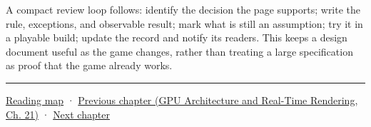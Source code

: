 A compact review loop follows: identify the decision the page supports; write the rule, exceptions, and observable result; mark what is still an assumption; try it in a playable build; update the record and notify its readers. This keeps a design document useful as the game changes, rather than treating a large specification as proof that the game already works.

\begin{center}\rule{0.5\linewidth}{0.5pt}\end{center}

\hyperref[volume-reading-map]{Reading map} · \href{../06-GPU-Architecture-and-Real-Time-Rendering/main.pdf\#nameddest=06-engine-ii-ch045-rasterizing-kernels-and-connecting-world-identity}{Previous chapter (GPU Architecture and Real-Time Rendering, Ch. 21)} · \hyperref[06-engine-ii-ch047-narrative-simulation-and-ai-in-playable-worlds]{Next chapter}
